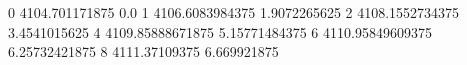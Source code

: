 0 4104.701171875 0.0
1 4106.6083984375 1.9072265625
2 4108.1552734375 3.4541015625
4 4109.85888671875 5.15771484375
6 4110.95849609375 6.25732421875
8 4111.37109375 6.669921875
